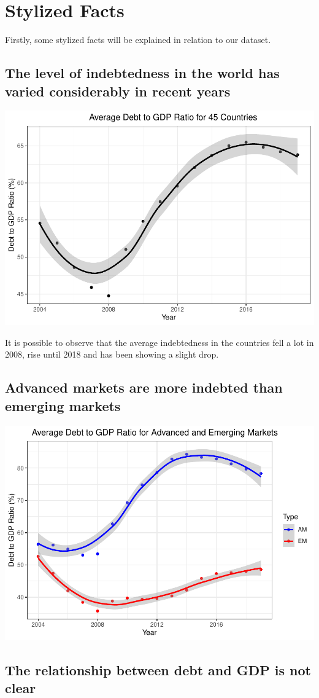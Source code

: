 \documentclass[]{article}
\begin{document}
\section{Stylized Facts}\label{stylized-facts}

Firstly, some stylized facts will be explained in relation to our
dataset.

\subsection{The level of indebtedness in the world has varied
considerably in recent
years}\label{the-level-of-indebtedness-in-the-world-has-varied-considerably-in-recent-years}

\includegraphics{Insper_Data_Macro_Project_Sep_files/figure-latex/unnamed-chunk-2-1.pdf}

It is possible to observe that the average indebtedness in the countries
fell a lot in 2008, rise until 2018 and has been showing a slight drop.

\subsection{Advanced markets are more indebted than emerging
markets}\label{advanced-markets-are-more-indebted-than-emerging-markets}

\includegraphics{Insper_Data_Macro_Project_Sep_files/figure-latex/unnamed-chunk-3-1.pdf}

\subsection{The relationship between debt and GDP is not
clear}\label{the-relationship-between-debt-and-gdp-is-not-clear}
\end{document}
